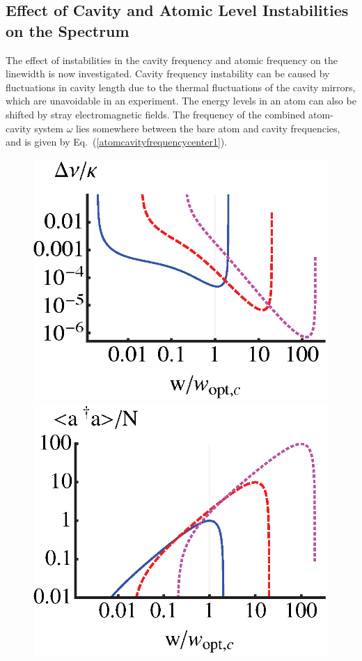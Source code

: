 \documentclass[aps,
twocolumn,
showpacs,
superscriptaddress,groupedaddress]{revtex4}
\begin{document}
\subsection{Effect of Cavity and Atomic Level Instabilities on the
Spectrum}

The effect of instabilities in the cavity frequency and atomic frequency
on the linewidth is now investigated. Cavity frequency instability can
be caused by fluctuations in cavity length due to the thermal
fluctuations of the cavity mirrors, which are unavoidable in an
experiment. The energy levels in an atom can also be shifted by stray
electromagnetic fields. The frequency of the combined atom-cavity system
$\omega$ lies somewhere between the bare atom and cavity frequencies,
and is given by Eq.~(\ref{atomcavityfrequencycenter1}).

\begin{figure}
\begin{center}
	\includegraphics[scale =0.415] {LinewidthComparisonLangevin.eps}
	\hspace{-4mm} \includegraphics[scale =0.415] {adaComparisonLangevin.eps}\\

\end{center}
\end{figure}
\end{document}
